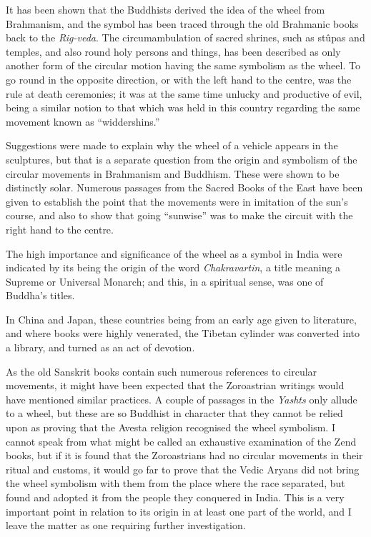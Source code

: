 \documentclass[a4paper, 11pt, oneside, polutonikogreek, english]{article}
\begin{document}
It has been shown that the Buddhists derived the idea of the wheel from Brahmanism, and the symbol has been traced through the old Brahmanic books back to the \emph{Rig-veda}. The circumambulation of sacred shrines, such as stûpas and temples, and also round holy persons and things, has been described as only another form of the circular motion having the same symbolism as the wheel. To go round in the opposite direction, or with the left hand to the centre, was the rule at death ceremonies; it was at the same time unlucky and productive of evil, being a similar notion to that which was held in this country regarding the same movement known as ``widdershins.''

Suggestions were made to explain why the wheel of a vehicle appears in the sculptures, but that is a separate question from the origin and symbolism of the circular movements in Brahmanism and Buddhism. These were shown to be distinctly solar. Numerous passages from the Sacred Books of the East have been given to establish the point that the movements were in imitation of the sun's course, and also to show that going ``sunwise'' was to make the circuit with the right hand to the centre.

The high importance and significance of the wheel as a symbol in India were indicated by its being the origin of the word \emph{Chakravartin}, a title meaning a Supreme or Universal Monarch; and this, in a spiritual sense, was one of Buddha's titles.

In China and Japan, these countries being from an early age given to literature, and where books were highly venerated, the Tibetan cylinder was converted into a library, and turned as an act of devotion.

As the old Sanskrit books contain such numerous references to circular movements, it might have been expected that the Zoroastrian writings would have mentioned similar practices. A couple of passages in the \emph{Yashts} only allude to a wheel, but these are so Buddhist in character that they cannot be relied upon as proving that the Avesta religion recognised the wheel symbolism. I cannot speak from what might be called an exhaustive examination of the Zend books, but if it is found that the Zoroastrians had no circular movements in their ritual and customs, it would go far to prove that the Vedic Aryans did not bring the wheel symbolism with them from the place where the race separated, but found and adopted it from the people they conquered in India. This is a very important point in relation to its origin in at least one part of the world, and I leave the matter as one requiring further investigation.
\end{document}
